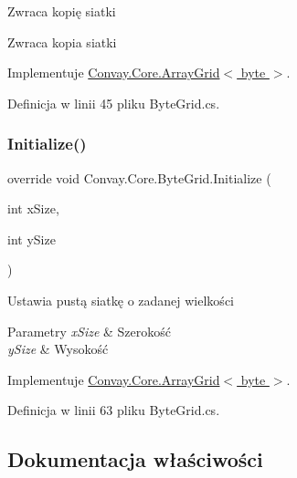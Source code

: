 Zwraca kopię siatki 

\begin{DoxyReturn}{Zwraca}
kopia siatki
\end{DoxyReturn}


Implementuje \hyperlink{class_convay_1_1_core_1_1_array_grid_a139eba7f8a6780b4ecbc446959e159ad}{Convay.\+Core.\+Array\+Grid$<$ byte $>$}.



Definicja w linii 45 pliku Byte\+Grid.\+cs.

\hypertarget{class_convay_1_1_core_1_1_byte_grid_a75128576734ebd27f9b469ed0f7aaeee}{}\label{class_convay_1_1_core_1_1_byte_grid_a75128576734ebd27f9b469ed0f7aaeee} 
\subsubsection{\texorpdfstring{Initialize()}{Initialize()}}
{\footnotesize\ttfamily override void Convay.\+Core.\+Byte\+Grid.\+Initialize (\begin{DoxyParamCaption}\item[{int}]{x\+Size,  }\item[{int}]{y\+Size }\end{DoxyParamCaption})\hspace{0.3cm}{\ttfamily [virtual]}}



Ustawia pustą siatkę o zadanej wielkości 


\begin{DoxyParams}{Parametry}
{\em x\+Size} & Szerokość\\
\hline
{\em y\+Size} & Wysokość\\
\hline
\end{DoxyParams}


Implementuje \hyperlink{class_convay_1_1_core_1_1_array_grid_a49501f55af9f747ed75cb94563b6d641}{Convay.\+Core.\+Array\+Grid$<$ byte $>$}.



Definicja w linii 63 pliku Byte\+Grid.\+cs.



\subsection{Dokumentacja właściwości}
\hypertarget{class_convay_1_1_core_1_1_byte_grid_ae80450d07296d3c4980ab27b9d0ef03b}{}\label{class_convay_1_1_core_1_1_byte_grid_ae80450d07296d3c4980ab27b9d0ef03b} 
